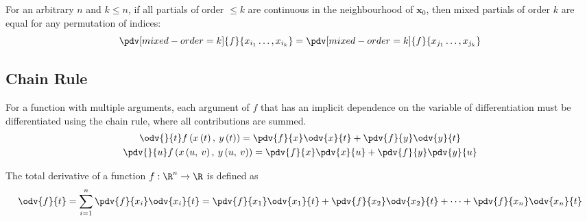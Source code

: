 \documentclass{article}
\begin{document}
\begin{remark}
    For an arbitrary \(n\) and \(k \leqslant n\), if all partials of order \(\leqslant \! k\) are continuous in the neighbourhood of \(\symbf{x}_0\),
    then mixed partials of order \(k\) are equal for any permutation of indices:
    \begin{equation*}
        \pdv[mixed-order=k]{f}{x_{i_1}\ldots,x_{i_k}} = \pdv[mixed-order=k]{f}{x_{j_1}\ldots,x_{j_k}}
    \end{equation*}
\end{remark}
\subsection{Chain Rule}
For a function with multiple arguments, each argument of \(f\) that has
an implicit dependence on the variable of differentiation must be
differentiated using the chain rule, where all contributions are
summed.
\begin{gather*}
    \odv{}{t} f\left( x\left( t \right),\: y\left( t \right) \right) = \pdv{f}{x} \odv{x}{t} + \pdv{f}{y} \odv{y}{t} \\
    \pdv{}{u} f\left( x\left( u,\: v \right),\: y\left( u,\: v \right) \right) = \pdv{f}{x} \pdv{x}{u} + \pdv{f}{y} \pdv{y}{u}
\end{gather*}
\begin{definition}
    The total derivative of a function \(f : \R^n \to \R\) is defined as
    \begin{equation*}
        \odv{f}{t} = \sum_{i = 1}^n \pdv{f}{x_i} \odv{x_i}{t} = \pdv{f}{x_1} \odv{x_1}{t} + \pdv{f}{x_2} \odv{x_2}{t} + \cdots + \pdv{f}{x_n} \odv{x_n}{t}
    \end{equation*}
\end{definition}
\end{document}
